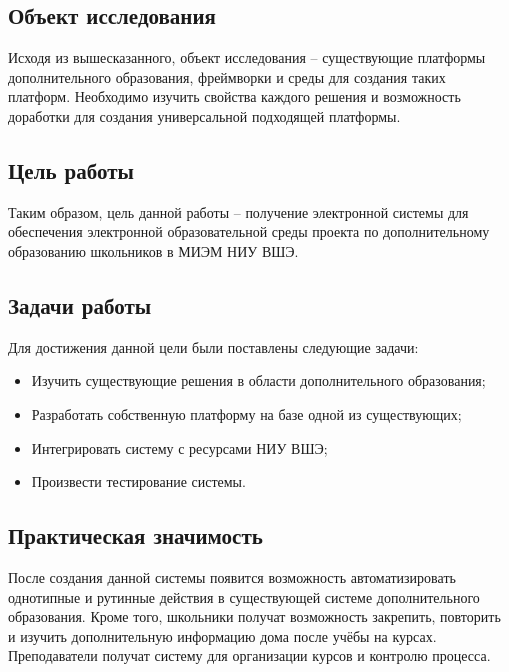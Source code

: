 \documentclass[a4paper,14pt]{article}
\begin{document}
\subsection{Объект исследования}

Исходя из вышесказанного, объект исследования -- существующие платформы дополнительного образования, фреймворки и среды для создания таких платформ.
Необходимо изучить свойства каждого решения и возможность доработки для создания универсальной подходящей платформы.


\subsection{Цель работы}
Таким образом, цель данной работы -- получение электронной системы для обеспечения электронной образовательной среды проекта по дополнительному образованию школьников в МИЭМ НИУ ВШЭ.

\subsection{Задачи работы}
Для достижения данной цели были поставлены следующие задачи:
\begin{itemize}
	\item Изучить существующие решения в области дополнительного образования;
	\item Разработать собственную платформу на базе одной из существующих;
	\item Интегрировать систему с ресурсами НИУ ВШЭ;
	\item Произвести тестирование системы.
\end{itemize}

\subsection{Практическая значимость}
После создания данной системы появится возможность автоматизировать однотипные и рутинные действия в существующей системе дополнительного образования.
Кроме того, школьники получат возможность закрепить, повторить и изучить дополнительную информацию дома после учёбы на курсах.
Преподаватели получат систему для организации курсов и контролю процесса.



\pagebreak

\end{document}
